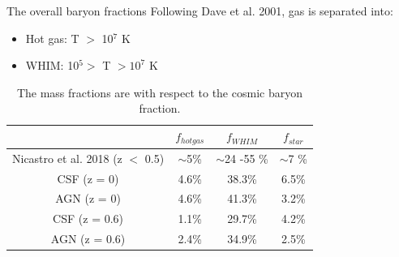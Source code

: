 \documentclass[aspectratio=43]{beamer}
\begin{document}
\begin{frame}{The overall baryon fractions}
    Following Dave et al. 2001, gas is separated into:
    \begin{itemize}
        \item[] Hot gas: T $>$ 10$^7$ K 
        \item[] WHIM: 10$^5 >$ T $> 10^7$ K 
    \end{itemize}
    
    \begin{table}[]
        \centering
        \begin{tabular}{c|c|c|c|}
            & $f_{hot gas}$ & $f_{WHIM}$ & $f_{star}$ \\
            \hline
           Nicastro et al. 2018 (z $<$ 0.5)  & $\sim$5\% & $\sim$24 -55 \% & $\sim$7 \% \\
           CSF (z = 0) & 4.6\% & 38.3\% & 6.5\% \\
           AGN (z = 0) & 4.6\% & 41.3\% & 3.2\% \\
           \hline
           CSF (z = 0.6) & 1.1\% & 29.7\% & 4.2\% \\
           AGN (z = 0.6) & 2.4\% & 34.9\% & 2.5\% \\
        \end{tabular}
        \caption{The mass fractions are with respect to the cosmic baryon fraction.}
        \label{tab:my_label}
    \end{table}
\end{frame}
\end{document}
